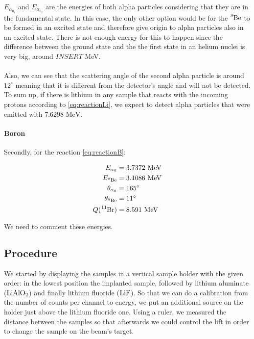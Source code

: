 \documentclass{article}
\begin{document}
\begin{multicols}{2}
$E_{\alpha_{0_1}}$ and $E_{\alpha_{0_2}}$ are the energies of both alpha particles considering that they are in the fundamental state. In this case, the only other option would be for the $\ce{^8Be}$ to be formed in an excited state and therefore give origin to alpha particles also in an excited state. There is not enough energy for this to happen since the difference between the ground state and the the first state in an helium nuclei is very big, around $INSERT$ MeV.
\paragraph{}
Also, we can see that the scattering angle of the second alpha particle is around $12 ^{\circ}$ meaning that it is different from the detector's angle and will not be detected. To sum up, if there is lithium in any sample that reacts with the incoming protons according to \ref{eq:reactionLi}, we expect to detect alpha particles that were emitted with $7.6298 \text{ MeV}$. 

\paragraph{Boron} Secondly, for the reaction \ref{eq:reactionB}:

\begin{equation}
\begin{split}
  E_{\alpha_0} &= 3.7372 \text{ MeV} \\
  E_{\ce{^8Be}} &= 3.1086 \text{ MeV} \\
  \theta_{\alpha_0} &= 165 ^{\circ} \\
  \theta_{\ce{^8Be}} &= 11 ^{\circ}\\
  Q (\ce{^11Br}) &= 8.591 \text{ MeV} \\
\end{split}
\label{eq:energiesBr}
\end{equation}

We need to comment these energies.

\subsection{Procedure}
    \label{sec:procedure}

We started by displaying the samples in a vertical sample holder with the given order: in the lowest position the implanted sample, followed by lithium aluminate ($\ce{LiAlO2}$) and finally lithium fluoride ($\ce{LiF}$). So that we can do a calibration from the number of counts per channel to energy, we put an additional source on the holder just above the lithium fluoride one. Using a ruler, we measured the distance between the samples so that afterwards we could control the lift in order to change the sample on the beam's target.


\end{multicols}
\end{document}
